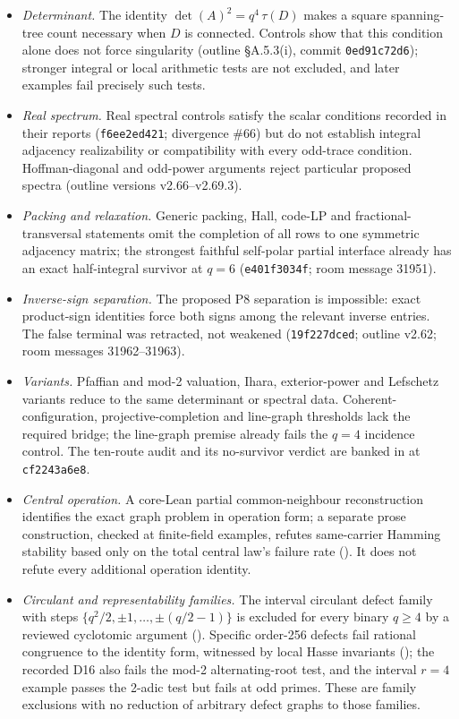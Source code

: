 \documentclass{anvil-paper}
\theoremstyle{definition}
\begin{document}
\begin{itemize}
\item \emph{Determinant.} The identity $\det(A)^2=q^4\,\tau(D)$ makes a square spanning-tree count necessary when $D$ is connected. Controls show that this condition alone does not force singularity (outline \S A.5.3(i), commit \texttt{0ed91c72d6}); stronger integral or local arithmetic tests are not excluded, and later examples fail precisely such tests.
\item \emph{Real spectrum.} Real spectral controls satisfy the scalar conditions recorded in their reports (\texttt{f6ee2ed421}; divergence \#66) but do not establish integral adjacency realizability or compatibility with every odd-trace condition. Hoffman-diagonal and odd-power arguments reject particular proposed spectra (outline versions v2.66--v2.69.3).
\item \emph{Packing and relaxation.} Generic packing, Hall, code-LP and fractional-transversal statements omit the completion of all rows to one symmetric adjacency matrix; the strongest faithful self-polar partial interface already has an exact half-integral survivor at $q=6$ (\texttt{e401f3034f}; room message 31951).
\item \emph{Inverse-sign separation.} The proposed P8 separation is impossible: exact product-sign identities force both signs among the relevant inverse entries. The false terminal was retracted, not weakened (\texttt{19f227dced}; outline v2.62; room messages 31962--31963).
\item \emph{Variants.} Pfaffian and mod-2 valuation, Ihara, exterior-power and Lefschetz variants reduce to the same determinant or spectral data. Coherent-configuration, projective-completion and line-graph thresholds lack the required bridge; the line-graph premise already fails the $q=4$ incidence control. The ten-route audit and its no-survivor verdict are banked in  at \texttt{cf2243a6e8}.
\item \emph{Central operation.} A core-Lean partial common-neighbour reconstruction identifies the exact graph problem in operation form; a separate prose construction, checked at finite-field examples, refutes same-carrier Hamming stability based only on the total central law's failure rate (). It does not refute every additional operation identity.
\item \emph{Circulant and representability families.} The interval circulant defect family with steps $\{q^2/2,\pm 1,\dots,\pm(q/2-1)\}$ is excluded for every binary $q\ge 4$ by a reviewed cyclotomic argument (). Specific order-256 defects fail rational congruence to the identity form, witnessed by local Hasse invariants (); the recorded D16 also fails the mod-2 alternating-root test, and the interval $r=4$ example passes the 2-adic test but fails at odd primes. These are family exclusions with no reduction of arbitrary defect graphs to those families.

\end{itemize}
\end{document}
